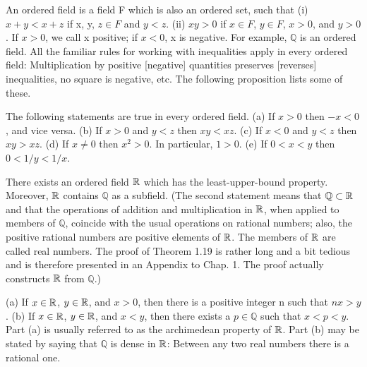 

\begin{definition} %
  \label{def:chap1:ordered_field}
  An ordered field is a field F which is also an ordered set, such that
  (i) $x+y < x+z$ if x, y, $z \in F$ and $y<z$.
  (ii) $xy > 0$ if $x \in F$, $y \in F$, $x>0$, and $y>0$.
  If $x>0$, we call x positive; if $x<0$, x is negative.
  For example, $\mathbb{Q}$ is an ordered field.
  All the familiar rules for working with inequalities apply in every
  ordered field: Multiplication by positive [negative] quantities
  preserves [reverses] inequalities, no square is negative, etc. The
  following proposition lists some of these.
\end{definition}

\begin{proposition} %
  \label{prop:chap1:ordered_field_properties}
  The following statements are true in every ordered field.
  (a) If $x>0$ then $-x<0$, and vice versa.
  (b) If $x>0$ and $y<z$ then $xy<xz$.
  (c) If $x<0$ and $y<z$ then $xy>xz$.
  (d) If $x \ne 0$ then $x^{2}>0$. In particular, $1 > 0$.
  (e) If $0<x<y$ then $0<1/y<1/x$.
\end{proposition}

\begin{theorem}[Existence of R] %
  \label{thm:chap1:existence_of_R}
  There exists an ordered field $\mathbb{R}$ which has the least-upper-bound property.
  Moreover, $\mathbb{R}$ contains $\mathbb{Q}$ as a subfield.
  (The second statement means that $\mathbb{Q} \subset \mathbb{R}$ and that
    the operations of addition and multiplication in $\mathbb{R}$, when
    applied to members of $\mathbb{Q}$, coincide with the usual
    operations on rational numbers; also, the positive rational
    numbers are positive elements of $\mathbb{R}$.
    The members of $\mathbb{R}$ are called real numbers.
    The proof of Theorem 1.19 is rather long and a bit tedious and is
    therefore presented in an Appendix to Chap. 1. The proof actually
  constructs $\mathbb{R}$ from $\mathbb{Q}$.)
\end{theorem}

\begin{theorem} %
  \label{thm:chap1:archimedean_density}
  (a) If $x \in \mathbb{R}$, $y \in \mathbb{R}$, and $x>0$, then there is a positive
  integer n such that $nx > y$.
  (b) If $x \in \mathbb{R}$, $y \in \mathbb{R}$, and $x<y$, then there exists a $p
  \in \mathbb{Q}$ such that $x<p<y$.
  Part (a) is usually referred to as the archimedean property of
  $\mathbb{R}$. Part (b) may be stated by saying that $\mathbb{Q}$ is dense
  in $\mathbb{R}$: Between any two real numbers there is a rational one.
\end{theorem}


